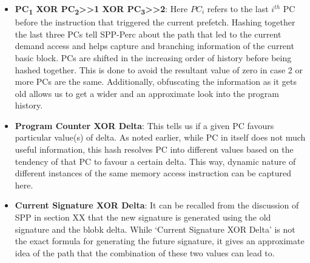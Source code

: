 \begin{itemize}
\item \textbf{PC\textsubscript{1} XOR PC\textsubscript{2}>>1 XOR
    PC\textsubscript{3}>>2}: Here $PC_i$ refers to the last $i^{th}$
  PC before the instruction that triggered the current prefetch.
  Hashing together the last three PCs tell SPP-Perc about the path
  that led to the current demand access and helps capture and
  branching information of the current basic block.  PCs are shifted
  in the increasing order of history before being hashed together.
  This is done to avoid the resultant value of zero in case 2 or more
  PCs are the same.  Additionally, obfuscating the information as it
  gets old allows us to get a wider and an approximate look into the
  program history.

\item \textbf{Program Counter XOR Delta}: This tells us if a given PC
  favours particular value(s) of delta.  As noted earlier, while PC in
  itself does not much useful information, this hash resolves PC into
  different values based on the tendency of that PC to favour a
  certain delta.  This way, dynamic nature of different instances of
  the same memory access instruction can be captured here.

\item \textbf{Current Signature XOR Delta}: It can be recalled from
  the discussion of SPP in section XX that the new signature is
  generated using the old signature and the blobk delta.  While
  `Current Signature XOR Delta' is not the exact formula for
  generating the future signature, it gives an approximate idea of the
  path that the combination of these two values can lead to.


\end{itemize} 

